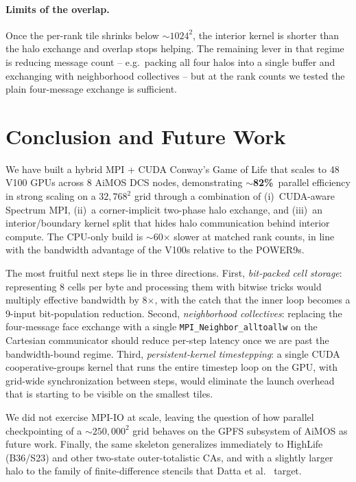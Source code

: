 \documentclass[sigconf,nonacm,10pt]{acmart}
\begin{document}
\paragraph{Limits of the overlap.}
Once the per-rank tile shrinks below $\sim$$1024^{2}$, the interior
kernel is shorter than the halo exchange and overlap stops helping.
The remaining lever in that regime is reducing message count -- e.g.\
packing all four halos into a single buffer and exchanging with
neighborhood collectives -- but at the rank counts we tested the
plain four-message exchange is sufficient.

\section{Conclusion and Future Work}\label{sec:conc}

We have built a hybrid MPI + CUDA Conway's Game of Life that scales to
48 V100 GPUs across 8 AiMOS DCS nodes, demonstrating
$\sim$\textbf{82\%}\,%
parallel efficiency in strong scaling on a $32{,}768^{2}$ grid through
a combination of (i)~CUDA-aware Spectrum MPI, (ii)~a corner-implicit
two-phase halo exchange, and (iii)~an interior/boundary kernel split
that hides halo communication behind interior compute. The CPU-only
build is $\sim$60$\times$ slower at matched rank counts, in line with
the bandwidth advantage of the V100s relative to the POWER9s.

The most fruitful next steps lie in three directions. First,
\emph{bit-packed cell storage}: representing 8 cells per byte and
processing them with bitwise tricks would multiply effective bandwidth
by 8$\times$, with the catch that the inner loop becomes a 9-input
bit-population reduction. Second, \emph{neighborhood collectives}:
replacing the four-message face exchange with a single
\texttt{MPI\_Neighbor\_alltoallw} on the Cartesian communicator should
reduce per-step latency once we are past the bandwidth-bound regime.
Third, \emph{persistent-kernel timestepping}: a single CUDA
cooperative-groups kernel that runs the entire timestep loop on the
GPU, with grid-wide synchronization between steps, would eliminate the
launch overhead that is starting to be visible on the smallest tiles.

We did not exercise MPI-IO at scale, leaving the question of how
parallel checkpointing of a $\sim 250{,}000^{2}$ grid behaves on the
GPFS subsystem of AiMOS as future work. Finally, the same skeleton
generalizes immediately to HighLife (\textsf{B36/S23}) and other
two-state outer-totalistic CAs, and with a slightly larger halo to
the family of finite-difference stencils that
Datta et al.~\cite{datta2008stencil} target.
\end{document}
